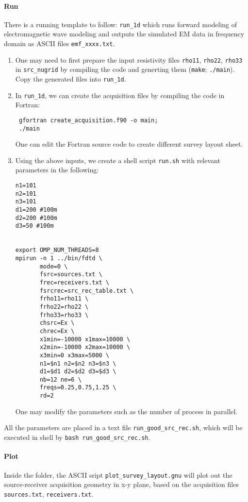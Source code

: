 \documentclass[10pt]{article}
\begin{document}
\paragraph{Run} There is a running template to follow: \verb|run_1d| which runs forward modeling of electromagnetic wave modeling and outputs the simulated EM data in frequency domain as ASCII files \verb|emf_xxxx.txt|.
\begin{enumerate}
 \item 
One may need to first prepare the input resistivity files \verb|rho11|, \verb|rho22|, \verb|rho33| in \verb|src_nugrid| by compiling the code and generting them (\verb|make|; \verb|./main|). Copy the generated files into \verb|run_1d|.

\item In \verb|run_1d|, we can create the acquisition files by compiling the code in Fortran:
\begin{verbatim}
 gfortran create_acquisition.f90 -o main;
 ./main
\end{verbatim}
One can edit the Fortran source code to create  different survey layout sheet.

\item Using the above inputs, we create a shell script \verb|run.sh| with relevant parameters in the following:
\begin{verbatim}
n1=101
n2=101
n3=101
d1=200 #100m
d2=200 #100m
d3=50 #100m


export OMP_NUM_THREADS=8
mpirun -n 1 ../bin/fdtd \
       mode=0 \
       fsrc=sources.txt \
       frec=receivers.txt \
       fsrcrec=src_rec_table.txt \
       frho11=rho11 \
       frho22=rho22 \
       frho33=rho33 \
       chsrc=Ex \
       chrec=Ex \
       x1min=-10000 x1max=10000 \
       x2min=-10000 x2max=10000 \
       x3min=0 x3max=5000 \
       n1=$n1 n2=$n2 n3=$n3 \
       d1=$d1 d2=$d2 d3=$d3 \
       nb=12 ne=6 \
       freqs=0.25,0.75,1.25 \
       rd=2 
\end{verbatim}
One may modify the parameters such as the number of process in parallel.

\end{enumerate}




All the parameters are placed in a text file \verb|run_good_src_rec.sh|, which will be executed in shell by \verb|bash run_good_src_rec.sh|.

\paragraph{Plot} Inside the folder, the ASCII sript \verb|plot_survey_layout.gnu| will plot out the source-receiver acquisition geometry in x-y plane, based on the acquisition files \verb|sources.txt|, \verb|receivers.txt|.
\end{document}
